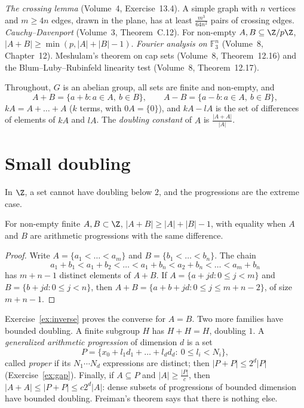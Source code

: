 \begin{reminder}
\emph{The crossing lemma} (Volume~4, Exercise~13.4). A simple graph with $n$ vertices and $m\ge4n$ edges, drawn in the plane, has at least $\frac{m^3}{64n^2}$ pairs of crossing edges.
\emph{Cauchy--Davenport} (Volume~3, Theorem~C.12). For non-empty $A,B\subseteq\Z/p\Z$, $|A+B|\ge\min(p,|A|+|B|-1)$.
\emph{Fourier analysis on $\mathbb F_3^n$} (Volume~8, Chapter~12). Meshulam's theorem on cap sets (Volume~8, Theorem~12.16) and the Blum--Luby--Rubinfeld linearity test (Volume~8, Theorem~12.17).
\end{reminder}

Throughout, $G$ is an abelian group, all sets are finite and non-empty, and
\[
A+B=\{a+b:a\in A,\ b\in B\},\qquad A-B=\{a-b:a\in A,\ b\in B\},
\]
$kA=A+\dots+A$ ($k$ terms, with $0A=\{0\}$), and $kA-lA$ is the set of differences of elements of $kA$ and $lA$. The \emph{doubling constant} of $A$ is $\frac{|A+A|}{|A|}$.

\section{Small doubling}

In $\Z$, a set cannot have doubling below $2$, and the progressions are the extreme case.

\begin{lemma}\label{lem:chain}
For non-empty finite $A,B\subset\Z$, $|A+B|\ge|A|+|B|-1$, with equality when $A$ and $B$ are arithmetic progressions with the same difference.
\end{lemma}
\begin{proof}
Write $A=\{a_1<\dots<a_m\}$ and $B=\{b_1<\dots<b_n\}$. The chain
\[
a_1+b_1<a_1+b_2<\dots<a_1+b_n<a_2+b_n<\dots<a_m+b_n
\]
has $m+n-1$ distinct elements of $A+B$. If $A=\{a+jd:0\le j<m\}$ and $B=\{b+jd:0\le j<n\}$, then $A+B=\{a+b+jd:0\le j\le m+n-2\}$, of size $m+n-1$.
\end{proof}

Exercise~\ref{ex:inverse} proves the converse for $A=B$. Two more families have bounded doubling. A finite subgroup $H$ has $H+H=H$, doubling $1$. A \emph{generalized arithmetic progression} of dimension $d$ is a set
\[
P=\{x_0+l_1d_1+\dots+l_dd_d:\ 0\le l_i<N_i\},
\]
called \emph{proper} if its $N_1\cdots N_d$ expressions are distinct; then $|P+P|\le2^d|P|$ (Exercise~\ref{ex:gap}). Finally, if $A\subseteq P$ and $|A|\ge\frac{|P|}c$, then $|A+A|\le|P+P|\le c2^d|A|$: dense subsets of progressions of bounded dimension have bounded doubling. Freiman's theorem says that there is nothing else.

